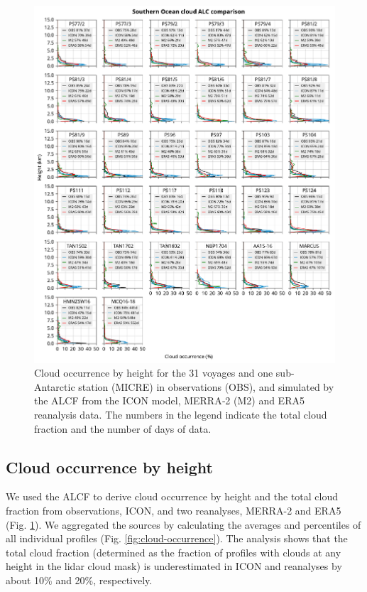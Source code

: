 \documentclass[12pt,a4paper]{article}
\begin{document}
\begin{figure}[p!]
\centerline{
\includegraphics[width=1.06\textwidth]{img/cloud_occurrence_panel.pdf}
}
\caption{Cloud occurrence by height for the 31 voyages and one sub-Antarctic
station (MICRE) in observations (OBS), and simulated by the ALCF from the
ICON model, MERRA‐2 (M2) and ERA5 reanalysis data. The numbers in the legend
indicate the total cloud fraction and the number of days of data.}
\label{fig:cloud-occurrence-panel}
\end{figure}

\subsection{Cloud occurrence by height}

We used the ALCF to derive cloud occurrence by height and the total cloud
fraction from observations, ICON, and two reanalyses, MERRA-2 and ERA5 (Fig.
\ref{fig:cloud-occurrence-panel}). We aggregated the sources by calculating the
averages and percentiles of all individual profiles (Fig.
\ref{fig:cloud-occurrence}). The analysis shows that the total cloud fraction
(determined as the fraction of profiles with clouds at any height in the lidar
cloud mask) is underestimated in ICON and reanalyses by about 10\% and 20\%,
respectively.
\end{document}
